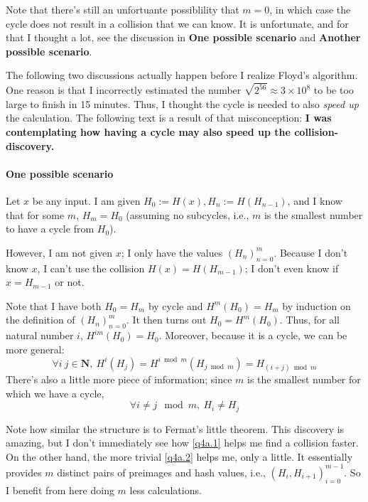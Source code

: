 \documentclass{6160}
\begin{document}
Note that there's still an unfortuante possiblility that $m = 0$, in which case
the cycle does not result in a collision that we can know. It is unfortunate,
and for that I thought a lot, see the discussion in \textbf{One possible
scenario} and \textbf{Another possible scenario}. 

The following two discussions actually happen before I realize Floyd's
algorithm. One reason is that I incorrectly estimated the number $\sqrt{2^{56}}
\approx 3 \times 10^8$ to be too large to finish in 15 minutes.  Thus, I thought
the cycle is needed to also \emph{speed up} the calculation. The following text
is a result of that misconception: \textbf{I was contemplating how having a
cycle may also speed up the collision-discovery.}

\paragraph{One possible scenario}
Let $x$ be any input. I am given $H_0 := H(x), H_n := H(H_{n-1})$, and I know
that for some $m$, $H_m = H_0$ (assuming no subcycles, i.e., $m$ is the smallest
number to have a cycle from $H_0$).

However, I am not given $x$; I only have the values $(H_n)_{n=0}^m$.  Because I
don't know $x$, I can't use the collision $H(x) = H(H_{m-1})$; I don't even know
if $x = H_{m-1}$ or not.

Note that I have both $H_0 = H_m$ by cycle and $H^{m}(H_0) = H_m$ by induction
on the definition of $(H_n)_{n=0}^m$. It then turns out $H_0 = H^m(H_0)$. Thus,
for all natural number $i$, $H^{im}(H_0) = H_0$. Moreover, because it is a
cycle, we can be more general:
\begin{equation} \label{eq:q4a.1}
	\forall i\ j \in \mathbf{N},\ 
	H^i (H_j) = H^{i \bmod m} (H_{j \bmod m}) = H_{(i+j) \bmod m}
\end{equation}
There's also a little more piece of information; since $m$ is the smallest
number for which we have a cycle, 
\begin{equation} \label{eq:q4a.2}
	\forall i \ne j \mod m,\ 
	H_i \ne H_j
\end{equation}

Note how similar the structure is to Fermat's little theorem. This discovery is
amazing, but I don't immediately see how \eqref{q4a.1} helps me find a
collision faster. On the other hand, the more trivial \eqref{q4a.2} helps me,
only a little. It essentially provides $m$ distinct pairs of preimages and
hash values, i.e., $(H_i, H_{i+1})_{i=0}^{m-1}$. So I benefit from here doing
$m$ less calculations.
\end{document}
